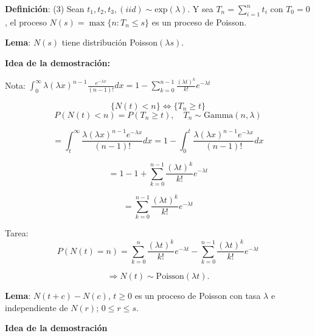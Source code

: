 \documentclass[12pt,a4paper]{article}
\newcommand{\definicion}[1]{%
\begin{definicionbox}
\textbf{Definición}: #1
\end{definicionbox}
}
\newcommand{\lema}[1]{%
\begin{lemabox}
\textbf{Lema}: #1
\end{lemabox}
}
\begin{document}
\definicion{(3) Sean $t_1, t_2, t_3, (iid) \sim \text{exp}(\lambda)$. Y sea $T_n = \sum_{i=1}^{n} t_i$ con $T_0 = 0$, el proceso $N(s) = \max\{n : T_n \leq s\}$ es un proceso de Poisson.}


\lema{$N(s)$ tiene distribución Poisson$(\lambda s)$.}

\textbf{Idea de la demostración:}

Nota: $\int_0^{\infty} \lambda (\lambda x)^{n-1} \frac{e^{-\lambda x}}{(n-1)!} dx = 1 - \sum_{k=0}^{n-1} \frac{(\lambda t)^k}{k!} e^{-\lambda t}$

\begin{equation*}
\{N(t) < n\} \Leftrightarrow \{T_n \geq t\}
\end{equation*}
\begin{equation*}
P(N(t) < n) = P(T_n \geq t), \quad T_n \sim \text{Gamma}(n, \lambda)
\end{equation*}

\begin{equation*}
= \int_t^{\infty} \frac{\lambda (\lambda x)^{n-1} e^{-\lambda x}}{(n-1)!} dx = 1 - \int_0^t \frac{\lambda (\lambda x)^{n-1} e^{-\lambda x}}{(n-1)!} dx
\end{equation*}

\begin{equation*}
= 1 - 1 + \sum_{k=0}^{n-1} \frac{(\lambda t)^k}{k!} e^{-\lambda t}
\end{equation*}

\begin{equation*}
= \sum_{k=0}^{n-1} \frac{(\lambda t)^k}{k!} e^{-\lambda t}
\end{equation*}

Tarea:
\begin{equation*}
P(N(t) = n) = \sum_{k=0}^{n} \frac{(\lambda t)^k}{k!} e^{-\lambda t} - \sum_{k=0}^{n-1} \frac{(\lambda t)^k}{k!} e^{-\lambda t}
\end{equation*}

\begin{equation*}
\Rightarrow N(t) \sim \text{Poisson}(\lambda t).
\end{equation*}

\lema{$N(t+c) - N(c)$, $t \geq 0$ es un proceso de Poisson con tasa $\lambda$ e independiente de $N(r)$; $0 \leq r \leq s$.}

\textbf{Idea de la demostración}
\end{document}
